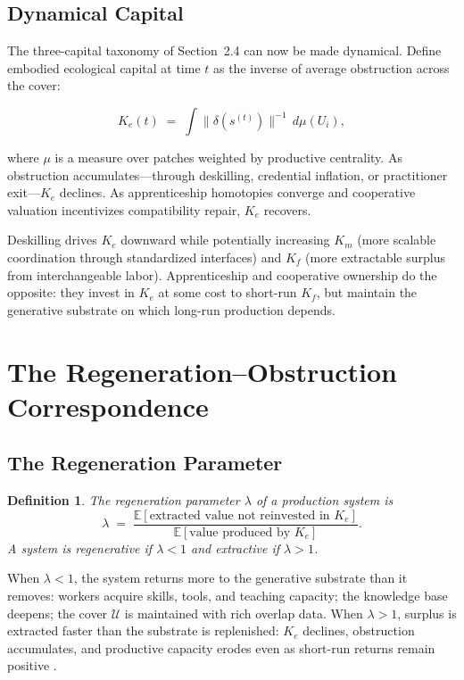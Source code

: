\documentclass[12pt]{article}
\newtheorem{definition}{Definition}
\begin{document}
\subsection{Dynamical Capital}

The three-capital taxonomy of Section~2.4 can now be made dynamical. Define embodied ecological capital at time $t$ as the inverse of average obstruction across the cover:

\begin{equation}
K_e(t) \;=\; \int \bigl\|\delta(s^{(t)})\bigr\|^{-1}\, d\mu(U_i),
\end{equation}

where $\mu$ is a measure over patches weighted by productive centrality. As obstruction accumulates---through deskilling, credential inflation, or practitioner exit---$K_e$ declines. As apprenticeship homotopies converge and cooperative valuation incentivizes compatibility repair, $K_e$ recovers.

Deskilling drives $K_e$ downward while potentially increasing $K_m$ (more scalable coordination through standardized interfaces) and $K_f$ (more extractable surplus from interchangeable labor). Apprenticeship and cooperative ownership do the opposite: they invest in $K_e$ at some cost to short-run $K_f$, but maintain the generative substrate on which long-run production depends.

\section{The Regeneration--Obstruction Correspondence}

\subsection{The Regeneration Parameter}

\begin{definition}
The \emph{regeneration parameter} $\lambda$ of a production system is
\begin{equation}
\lambda \;=\; \frac{\mathbb{E}[\text{extracted value not reinvested in } K_e]}{\mathbb{E}[\text{value produced by } K_e]}.
\end{equation}
A system is \emph{regenerative} if $\lambda < 1$ and \emph{extractive} if $\lambda > 1$.
\end{definition}

When $\lambda < 1$, the system returns more to the generative substrate than it removes: workers acquire skills, tools, and teaching capacity; the knowledge base deepens; the cover $\mathcal{U}$ is maintained with rich overlap data. When $\lambda > 1$, surplus is extracted faster than the substrate is replenished: $K_e$ declines, obstruction accumulates, and productive capacity erodes even as short-run returns remain positive \cite{Piketty2014,GeorgescuRoegen1971}.
\end{document}
